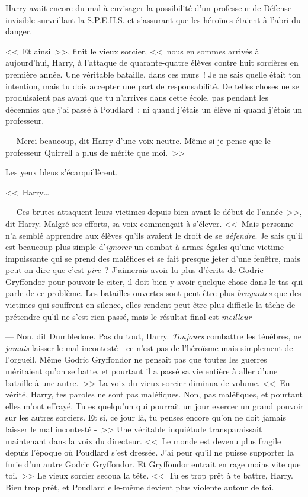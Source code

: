 Harry avait encore du mal à envisager la possibilité d'un professeur de Défense invisible surveillant la S.P.E.H.S. et s'assurant que les héroïnes étaient à l'abri du danger.

<<~Et ainsi~>>, finit le vieux sorcier, <<~nous en sommes arrivés à aujourd'hui, Harry, à l'attaque de quarante-quatre élèves contre huit sorcières en première année. Une véritable bataille, dans ces murs~! Je ne sais quelle était ton intention, mais tu dois accepter une part de responsabilité. De telles choses ne se produisaient pas avant que tu n'arrives dans cette école, pas pendant les décennies que j'ai passé à Poudlard~; ni quand j'étais un élève ni quand j'étais un professeur.

--- Merci beaucoup, dit Harry d'une voix neutre. Même si je pense que le professeur Quirrell a plus de mérite que moi.~>>

Les yeux bleus s'écarquillèrent.

<<~Harry…

--- Ces brutes attaquent leurs victimes depuis bien avant le début de l'année~>>, dit Harry. Malgré ses efforts, sa voix commençait à s'élever. <<~Mais personne n'a semblé apprendre aux élèves qu'ils avaient le droit de se \emph{défendre}. Je sais qu'il est beaucoup plus simple d'\emph{ignorer} un combat à armes égales qu'une victime impuissante qui se prend des maléfices et se fait presque jeter d'une fenêtre, mais peut-on dire que c'est \emph{pire}~? J'aimerais avoir lu plus d'écrits de Godric Gryffondor pour pouvoir le citer, il doit bien y avoir quelque chose dans le tas qui parle de ce problème. Les batailles ouvertes sont peut-être plus \emph{bruyantes} que des victimes qui souffrent en silence, elles rendent peut-être plus difficile la tâche de prétendre qu'il ne s'est rien passé, mais le résultat final est \emph{meilleur} -

--- Non, dit Dumbledore. Pas du tout, Harry. \emph{Toujours} combattre les ténèbres, ne \emph{jamais} laisser le mal incontesté - ce n'est pas de l'héroïsme mais simplement de l'orgueil. Même Godric Gryffondor ne pensait pas que toutes les guerres méritaient qu'on se batte, et pourtant il a passé sa vie entière à aller d'une bataille à une autre.~>> La voix du vieux sorcier diminua de volume. <<~En vérité, Harry, tes paroles ne sont pas maléfiques. Non, pas maléfiques, et pourtant elles m'ont effrayé. Tu es quelqu'un qui pourrait un jour exercer un grand pouvoir sur les autres sorciers. Et si, ce jour là, tu penses encore qu'on ne doit jamais laisser le mal incontesté -~>> Une véritable inquiétude transparaissait maintenant dans la voix du directeur. <<~Le monde est devenu plus fragile depuis l'époque où Poudlard s'est dressée. J'ai peur qu'il ne puisse supporter la furie d'un autre Godric Gryffondor. Et Gryffondor entrait en rage moins vite que toi.~>> Le vieux sorcier secoua la tête. <<~Tu es trop prêt à te battre, Harry. Bien trop prêt, et Poudlard elle-même devient plus violente autour de toi.

